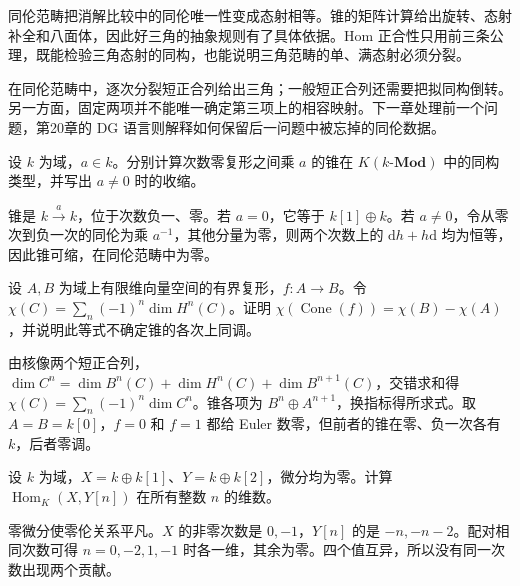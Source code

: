 




\begin{chaptersummary}
同伦范畴把消解比较中的同伦唯一性变成态射相等。锥的矩阵计算给出旋转、态射补全和八面体，因此好三角的抽象规则有了具体依据。Hom 正合性只用前三条公理，既能检验三角态射的同构，也能说明三角范畴的单、满态射必须分裂。

\ProseParagraphBreak
在同伦范畴中，逐次分裂短正合列给出三角；一般短正合列还需要把拟同构倒转。另一方面，固定两项并不能唯一确定第三项上的相容映射。下一章处理前一个问题，第20章的 DG 语言则解释如何保留后一问题中被忘掉的同伦数据。
\end{chaptersummary}

\BookExercises

\begin{exercise}\label{b4:ex:16-field-scalar}
设 \(k\) 为域，\(a\in k\)。分别计算次数零复形之间乘 \(a\) 的锥在 \(K(k\text{-}\mathbf{Mod})\) 中的同构类型，并写出 \(a\ne0\) 时的收缩。
\end{exercise}
\begin{solution}
锥是 \(k\xrightarrow{a}k\)，位于次数负一、零。若 \(a=0\)，它等于 \(k[1]\oplus k\)。若 \(a\ne0\)，令从零次到负一次的同伦为乘 \(a^{-1}\)，其他分量为零，则两个次数上的 \(\mathrm{d}h+h\mathrm{d}\) 均为恒等，因此锥可缩，在同伦范畴中为零。
\end{solution}

\begin{exercise}\label{b4:ex:16-cone-euler}
设 \(A,B\) 为域上有限维向量空间的有界复形，\(f:A\to B\)。令 \(\chi(C)=\sum_n(-1)^n\dim H^n(C)\)。证明 \(\chi(\operatorname{Cone}(f))=\chi(B)-\chi(A)\)，并说明此等式不确定锥的各次上同调。
\end{exercise}
\begin{solution}
由核像两个短正合列，\(\dim C^n=\dim B^n(C)+\dim H^n(C)+\dim B^{n+1}(C)\)，交错求和得 \(\chi(C)=\sum_n(-1)^n\dim C^n\)。锥各项为 \(B^n\oplus A^{n+1}\)，换指标得所求式。取 \(A=B=k[0]\)，\(f=0\) 和 \(f=1\) 都给 Euler 数零，但前者的锥在零、负一次各有 \(k\)，后者零调。
\end{solution}

\begin{exercise}\label{b4:ex:16-graded-hom}
设 \(k\) 为域，\(X=k\oplus k[1]\)、\(Y=k\oplus k[2]\)，微分均为零。计算 \(\operatorname{Hom}_K(X,Y[n])\) 在所有整数 \(n\) 的维数。
\end{exercise}
\begin{solution}
零微分使零伦关系平凡。\(X\) 的非零次数是 \(0,-1\)，\(Y[n]\) 的是 \(-n,-n-2\)。配对相同次数可得 \(n=0,-2,1,-1\) 时各一维，其余为零。四个值互异，所以没有同一次数出现两个贡献。
\end{solution}

